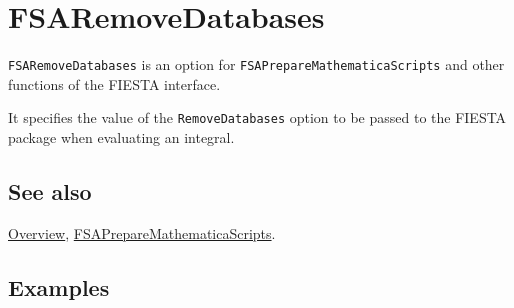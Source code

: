 \documentclass[../FeynHelpersManual.tex]{subfiles}
\begin{document}
\begin{Shaded}
\begin{Highlighting}[]
 
\end{Highlighting}
\end{Shaded}

\hypertarget{fsaremovedatabases}{
\section{FSARemoveDatabases}\label{fsaremovedatabases}}

\texttt{FSARemoveDatabases} is an option for
\texttt{FSAPrepareMathematicaScripts} and other functions of the FIESTA
interface.

It specifies the value of the \texttt{RemoveDatabases} option to be
passed to the FIESTA package when evaluating an integral.

\subsection{See also}

\hyperlink{toc}{Overview},
\hyperlink{fsapreparemathematicascripts}{FSAPrepareMathematicaScripts}.

\subsection{Examples}
\end{document}
